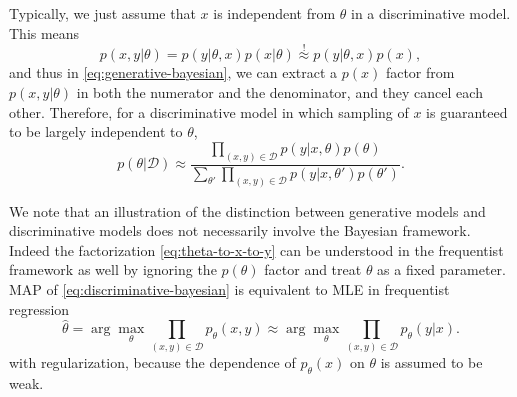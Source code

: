 \documentclass[hyperref, a4paper]{article}
\newcommand*{\argmax}{\arg\max}
\begin{document}
Typically, we just assume that $x$ is independent from $\theta$ in a discriminative model.
This means 
\begin{equation}
    p(x, y | \theta) = p(y | \theta, x) p(x | \theta) \stackrel{!}{\approx} p(y | \theta, x) p(x),
    \label{eq:generative-factorization}
\end{equation}
and thus in \eqref{eq:generative-bayesian},
we can extract a $p(x)$ factor from $p(x, y | \theta)$ in both the numerator and the denominator,
and they cancel each other. Therefore, for a discriminative model in which sampling of $x$ is guaranteed to be largely independent to $\theta$,
\begin{equation}
    p(\theta | \mathcal{D}) \approx \frac{
        \prod_{(x, y) \in \mathcal{D}} p(y | x, \theta) p(\theta)
    }{
        \sum_{\theta'} \prod_{(x, y) \in \mathcal{D}} p(y | x, \theta') p(\theta')
    }.
    \label{eq:discriminative-bayesian}
\end{equation}

We note that an illustration of the distinction between generative models and discriminative models 
does not necessarily involve the Bayesian framework.
Indeed the factorization \eqref{eq:theta-to-x-to-y} can be understood in the frequentist framework as well
by ignoring the $p(\theta)$ factor and treat $\theta$ as a fixed parameter.
MAP of \eqref{eq:discriminative-bayesian} is equivalent to MLE in frequentist regression
\begin{equation}
    \hat{\theta} = \argmax_\theta \prod_{(x, y) \in \mathcal{D}} p_\theta(x, y) \approx \argmax_\theta \prod_{(x, y) \in \mathcal{D}} p_\theta(y | x).
\end{equation}
with regularization, because the dependence of $p_\theta(x)$ on $\theta$ is assumed to be weak.
\end{document}

